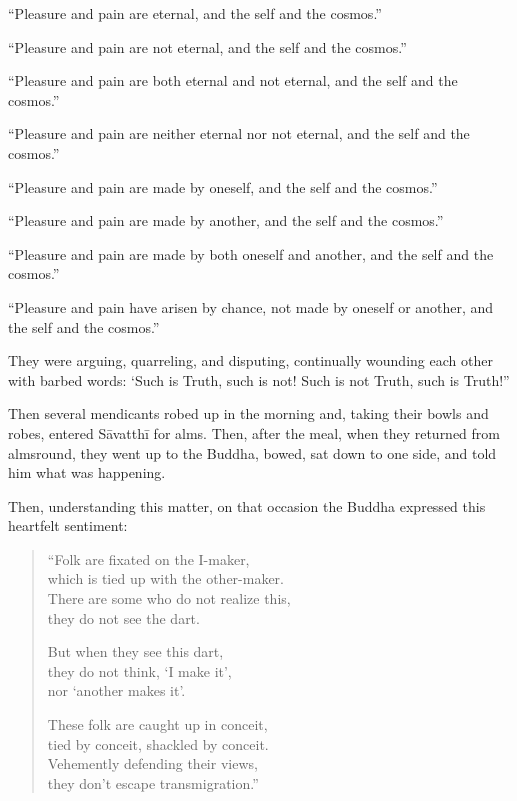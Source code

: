 \documentclass[12pt,openany]{book}%
\begin{document}
“Pleasure and pain are eternal, and the self and the cosmos.” 

“Pleasure and pain are not eternal, and the self and the cosmos.” 

“Pleasure and pain are both eternal and not eternal, and the self and the cosmos.” 

“Pleasure and pain are neither eternal nor not eternal, and the self and the cosmos.” 

“Pleasure and pain are made by oneself, and the self and the cosmos.” 

“Pleasure and pain are made by another, and the self and the cosmos.” 

“Pleasure and pain are made by both oneself and another, and the self and the cosmos.” 

“Pleasure and pain have arisen by chance, not made by oneself or another, and the self and the cosmos.” 

They were arguing, quarreling, and disputing, continually wounding each other with barbed words: ‘Such is Truth, such is not! Such is not Truth, such is Truth!” 

Then several mendicants robed up in the morning and, taking their bowls and robes, entered \textsanskrit{Sāvatthī} for alms. Then, after the meal, when they returned from almsround, they went up to the Buddha, bowed, sat down to one side, and told him what was happening. 

Then, understanding this matter, on that occasion the Buddha expressed this heartfelt sentiment: 

\begin{verse}%
“Folk are fixated on the I-maker, \\
which is tied up with the other-maker. \\
There are some who do not realize this, \\
they do not see the dart. 

But when they see this dart, \\
they do not think, ‘I make it’, \\
nor ‘another makes it’. 

These folk are caught up in conceit, \\
tied by conceit, shackled by conceit. \\
Vehemently defending their views, \\
they don’t escape transmigration.” 

%
\end{verse}
\end{document}
